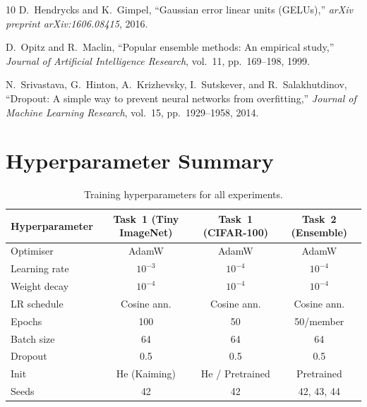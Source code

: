 \documentclass[11pt,letterpaper]{article}
\begin{document}
\begin{thebibliography}{10}
D.~Hendrycks and K.~Gimpel,
``Gaussian error linear units (GELUs),''
\textit{arXiv preprint arXiv:1606.08415}, 2016.

D.~Opitz and R.~Maclin,
``Popular ensemble methods: An empirical study,''
\textit{Journal of Artificial Intelligence Research}, vol.~11, pp.~169--198, 1999.

N.~Srivastava, G.~Hinton, A.~Krizhevsky, I.~Sutskever, and R.~Salakhutdinov,
``Dropout: A simple way to prevent neural networks from overfitting,''
\textit{Journal of Machine Learning Research}, vol.~15, pp.~1929--1958, 2014.

\end{thebibliography}

\appendix

\section{Hyperparameter Summary}

\begin{table}[H]
  \centering
  \caption{Training hyperparameters for all experiments.}
  \label{tab:hyperparams}
  \begin{tabular}{lccc}
    \toprule
    \textbf{Hyperparameter} &
    \textbf{Task~1 (Tiny ImageNet)} &
    \textbf{Task~1 (CIFAR-100)} &
    \textbf{Task~2 (Ensemble)} \\
    \midrule
    Optimiser      & AdamW        & AdamW        & AdamW \\
    Learning rate  & $10^{-3}$    & $10^{-4}$    & $10^{-4}$ \\
    Weight decay   & $10^{-4}$    & $10^{-4}$    & $10^{-4}$ \\
    LR schedule    & Cosine ann.  & Cosine ann.  & Cosine ann. \\
    Epochs         & 100          & 50           & 50/member \\
    Batch size     & 64           & 64           & 64 \\
    Dropout        & 0.5          & 0.5          & 0.5 \\
    Init           & He (Kaiming) & He / Pretrained & Pretrained \\
    Seeds          & 42           & 42           & 42, 43, 44 \\
    \bottomrule
  \end{tabular}
\end{table}
\end{document}

